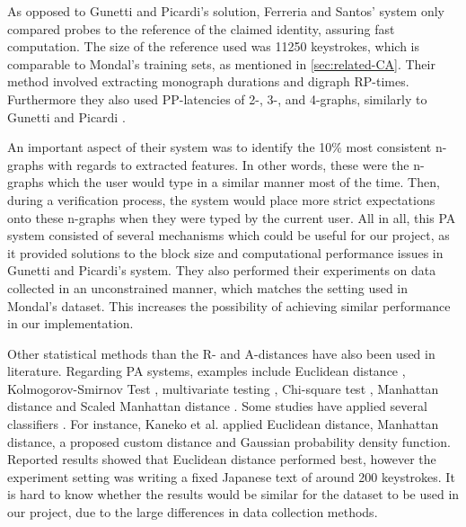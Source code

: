 As opposed to Gunetti and Picardi's solution, Ferreria and Santos' system \cite{superResults} only compared probes to the reference of the claimed identity, assuring fast computation.
The size of the reference used was 11250 keystrokes, which is comparable to Mondal's \cite{mondal} training sets, as mentioned in \cref{sec:related-CA}.
Their method involved extracting monograph durations and digraph RP-times.
Furthermore they also used PP-latencies of 2-, 3-, and 4-graphs, similarly to Gunetti and Picardi \cite{gnp}.

An important aspect of their system was to identify the 10\% most consistent n-graphs with regards to extracted features.
In other words, these were the n-graphs which the user would type in a similar manner most of the time.
Then, during a verification process, the system would place more strict expectations onto these n-graphs when they were typed by the current user.
All in all, this PA system consisted of several mechanisms which could be useful for our project, as it provided solutions to the block size and computational performance issues in Gunetti and Picardi's \cite{gnp} system.
They also performed their experiments on data collected in an unconstrained manner, which matches the setting used in Mondal's \cite{mondal} dataset. 
This increases the possibility of achieving similar performance in our implementation.

Other statistical methods than the R- and A-distances have also been used in literature.
Regarding PA systems, examples include Euclidean distance \cite{Kaneko, Monrose, Harun, Tappert}, Kolmogorov-Smirnov Test \cite{park, KANG201572}, multivariate testing \cite{KANG201572}, Chi-square test \cite{chi-square}, Manhattan distance \cite{Kaneko, Harun, cognition} and Scaled Manhattan distance \cite{Harun}.
Some studies have applied several classifiers \cite{hu, mondal, KANG201572, Harun, cognition, Kaneko}. 
For instance, Kaneko et al. \cite{Kaneko} applied Euclidean distance, Manhattan distance, a proposed custom distance and Gaussian probability density function. Reported results showed that Euclidean distance performed best, however the experiment setting was writing a fixed Japanese text of around 200 keystrokes.
It is hard to know whether the results would be similar for the dataset to be used in our project, due to the large differences in data collection methods.

